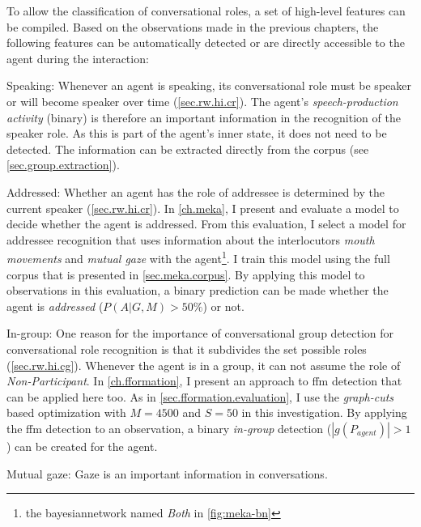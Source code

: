 To allow the classification of \glspl{conversational role}, a set of high-level features can be compiled.
Based on the observations made in the previous chapters, the following features can be automatically detected or are directly accessible to the agent during the interaction:

\begin{description}
\item{Speaking:} Whenever an agent is speaking, its \gls{conversational role} must be \gls{speaker} or will become \gls{speaker} over time (\cref{sec.rw.hi.cr}).
The agent's \emph{speech-production activity} (binary) is therefore an important information in the recognition of the \gls{speaker} role.
As this is part of the agent's inner state, it does not need to be detected.
The information can be extracted directly from the corpus (see \cref{sec.group.extraction}).
\item{Addressed:} Whether an agent has the role of \gls{addressee} is determined by the current \gls{speaker} (\cref{sec.rw.hi.cr}).
In \cref{ch.meka}, I present and evaluate a model to decide whether the agent is addressed.
From this evaluation, I select a model for \gls{addressee} recognition that uses information about the interlocutors \emph{mouth movements} and \emph{mutual gaze} with the agent\footnote{the \gls{bayesiannetwork} named \emph{Both} in \vref{fig:meka-bn}}.
I train this model using the full corpus that is presented in \cref{sec.meka.corpus}.
By applying this model to observations in this evaluation, a binary prediction can be made whether the agent is \emph{addressed} (\(P(A|G,M)>50\%\)) or not.
\item{In-group:} One reason for the importance of \gls{conversational group} detection for \gls{conversational role} recognition is that it subdivides the set possible roles (\cref{sec.rw.hi.cg}).
Whenever the agent is in a group, it can not assume the role of \emph{Non-Participant}.
In \cref{ch.fformation}, I present an approach to \gls{ffm} detection that can be applied here too.
As in \cref{sec.fformation.evaluation}, I use the \emph{graph-cuts} based optimization with \(M=4500\) and \(S=50\) in this investigation.
By applying the \gls{ffm} detection to an observation, a binary \emph{in-group} detection (\(|g(P_{agent})|>1\)) can be created for the agent.
\item{Mutual gaze:} Gaze is an important information in \glspl{conversation}.

\end{description}
